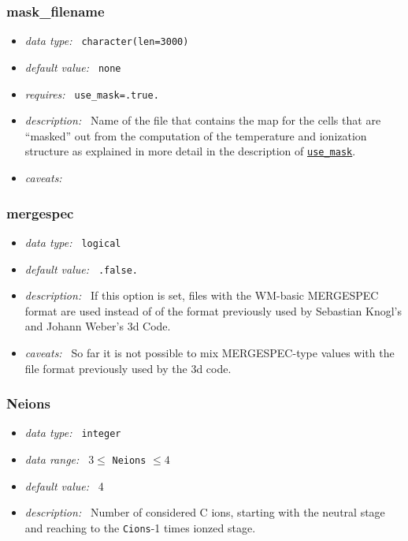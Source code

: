 \documentclass[a4paper,10pt]{article}
\begin{document}
\subsubsection{mask\_filename}
\label{opt:maskfilename}
\begin{itemize}
 \item \textit{data type:~} \texttt{character(len=3000)}
 \item \textit{default value:~} \texttt{none}
 \item \textit{requires:~} \texttt{use\_mask=.true.}
 \item \textit{description:~} Name of the file that contains the map for
 the cells that are ``masked'' out from the computation of the 
 temperature and ionization structure as  explained in more detail in the
 description of \texttt{\hyperref[opt:usemask]{use\_mask}}. 
 \item \textit{caveats:~} 
\end{itemize}


\subsubsection{mergespec}
\label{opt:mergespec}
\begin{itemize}
 \item \textit{data type:~} \texttt{logical}
 \item \textit{default value:~} \texttt{.false.}
 \item \textit{description:~} If this option is set, files with the WM-basic  
  MERGESPEC format are used instead of of the format previously used by 
  Sebastian Knogl's and Johann Weber's 3d Code. 
 \item \textit{caveats:~} So far it is not possible to mix MERGESPEC-type values with the
  file format previously used by the 3d code.
\end{itemize}


\subsubsection{Neions}
\label{opt:neions}
\begin{itemize}
 \item \textit{data type:~} \texttt{integer}
 \item \textit{data range:~}  $3 \leq$ \texttt{Neions} $\leq 4$ 
 \item \textit{default value:~} 4
 \item \textit{description:~} Number of considered C ions, starting with the 
 neutral stage and reaching to  the \texttt{Cions}-1 times ionzed stage.
\end{itemize}
\end{document}
